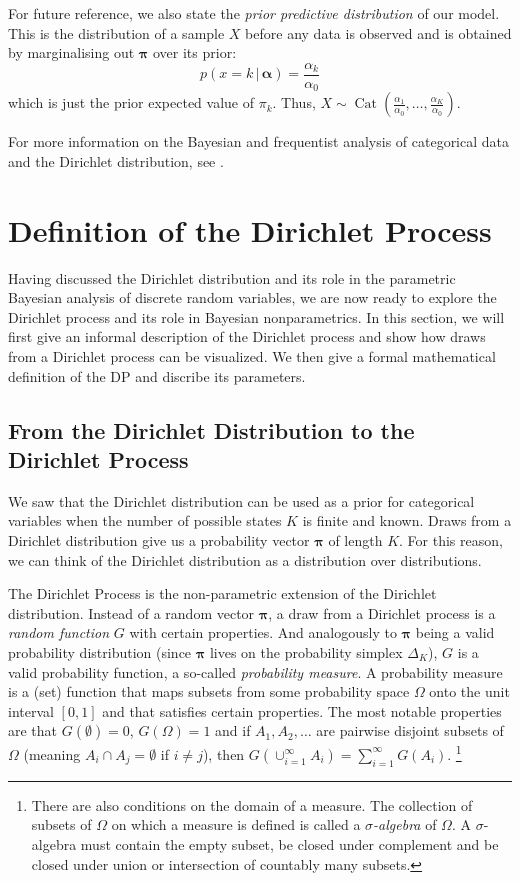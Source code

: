 \documentclass[final,3p,times,twocolumn]{elsarticle}
\DeclareMathOperator*{\Cat}{Cat}
\let\bs\boldsymbol
\begin{document}
For future reference, we also state the \emph{prior predictive distribution} of our model.
This is the distribution of a sample $X$ before any data is observed and is obtained by marginalising out $\bs \pi$ over its prior:
\begin{equation}
\label{eqn:dirpriorpredictive}
p(x = k\,|\,\bs \alpha) = \frac{\alpha_k}{\alpha_0}
\end{equation}
which is just the prior expected value of $\pi_k$.
Thus, $X \sim \Cat(\frac{\alpha_1}{\alpha_0},\dots,\frac{\alpha_K}{\alpha_0})$.

For more information on the Bayesian and frequentist analysis of categorical data and the Dirichlet distribution, see \cite{Bishop, Murphy}.


\section{Definition of the Dirichlet Process}
\label{sect:dp}
Having discussed the Dirichlet distribution and its role in the parametric Bayesian analysis of discrete random variables, we are now ready to explore the Dirichlet process and its role in Bayesian nonparametrics.
In this section, we will first give an informal description of the Dirichlet process and show how draws from a Dirichlet process can be visualized.
We then give a formal mathematical definition of the DP and discribe its parameters.

\subsection{From the Dirichlet Distribution to the Dirichlet Process}
We saw that the Dirichlet distribution can be used as a prior for categorical variables when the number of possible states $K$ is finite and known. Draws from a Dirichlet distribution give us a probability vector $\bs \pi$ of length $K$. For this reason, we can think of the Dirichlet distribution as a distribution over distributions.

The Dirichlet Process is the non-parametric extension of the Dirichlet distribution.
Instead of a random vector $\bs \pi$, a draw from a Dirichlet process is a \emph{random function} $G$ with certain properties.
And analogously to $\bs \pi$ being a valid probability distribution (since $\bs \pi$ lives on the probability simplex $\Delta_K$), $G$ is a valid probability function, a so-called \emph{probability measure}.
A probability measure is a (set) function that maps subsets from some probability space $\Omega$ onto the unit interval $[0,1]$ and that satisfies certain properties.
The most notable properties are that $G(\emptyset)=0$, $G(\Omega)=1$ and if $A_1,A_2,\dots$ are pairwise disjoint subsets of $\Omega$ (meaning $A_i\cap A_j = \emptyset$ if $i\neq j$), then $G(\cup_{i=1}^\infty A_i) = \sum_{i=1}^\infty G(A_i)$.
\footnote{There are also conditions on the domain of a measure.
The collection of subsets of $\Omega$ on which a measure is defined is called a \emph{$\sigma$-algebra} of $\Omega$.
A $\sigma$-algebra must contain the empty subset, be closed under complement and be closed under union or intersection of countably many subsets.}
\end{document}
